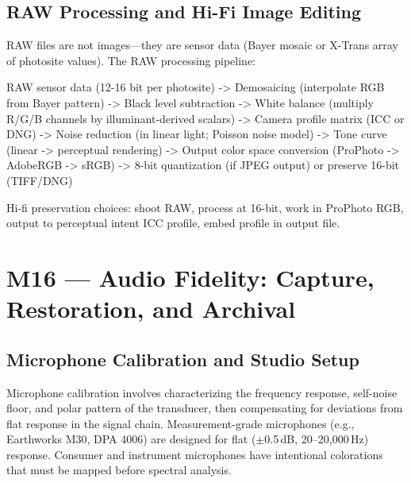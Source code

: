\documentclass[11pt,letterpaper]{article}
\newenvironment{asciibox}{%
  \begin{tcolorbox}[colback=MidGray!8,colframe=MidGray!40,arc=2pt,left=6pt,right=6pt,top=4pt,bottom=4pt,breakable]
  \ttfamily\small
}{%
  \end{tcolorbox}
}
\begin{document}
\subsection{RAW Processing and Hi-Fi Image Editing}

RAW files are not images---they are sensor data (Bayer mosaic or X-Trans array of photosite values). The RAW processing pipeline:

\begin{asciibox}
RAW sensor data (12-16 bit per photosite)
  -> Demosaicing (interpolate RGB from Bayer pattern)
  -> Black level subtraction
  -> White balance (multiply R/G/B channels by illuminant-derived scalars)
  -> Camera profile matrix (ICC or DNG)
  -> Noise reduction (in linear light; Poisson noise model)
  -> Tone curve (linear -> perceptual rendering)
  -> Output color space conversion (ProPhoto -> AdobeRGB -> sRGB)
  -> 8-bit quantization (if JPEG output) or preserve 16-bit (TIFF/DNG)
\end{asciibox}

Hi-fi preservation choices: shoot RAW, process at 16-bit, work in ProPhoto RGB, output to perceptual intent ICC profile, embed profile in output file.

\newpage

\section{M16 — Audio Fidelity: Capture, Restoration, and Archival}

\subsection{Microphone Calibration and Studio Setup}

Microphone calibration involves characterizing the frequency response, self-noise floor, and polar pattern of the transducer, then compensating for deviations from flat response in the signal chain. Measurement-grade microphones (e.g., Earthworks M30, DPA 4006) are designed for flat ($\pm$0.5\,dB, 20--20,000\,Hz) response. Consumer and instrument microphones have intentional colorations that must be mapped before spectral analysis.
\end{document}
